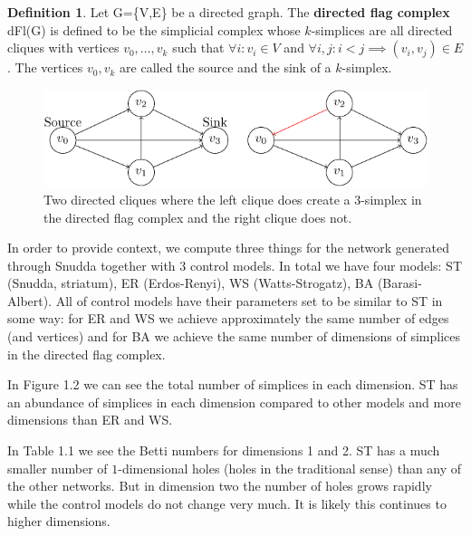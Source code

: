 \documentclass[oneside,a4paper,12pt, DIV=calc]{scrbook}
\theoremstyle{definition}
\newtheorem{definition}{Definition}
\begin{document}
\begin{definition}
  Let G=\{V,E\} be a directed graph. The \textbf{directed flag complex} dFl(G) is defined to be the simplicial complex whose $k$-simplices are all directed cliques with vertices $v_{0},\dots,v_{k}$ such that $\forall i: v_{i} \in V$
  and $\forall i,j: i < j \implies (v_{i}, v_{j}) \in E$. The vertices $v_{0}, v_{k}$ are called the source and the sink of a $k$-simplex.
\end{definition}

\begin{figure}[ht]
  \centering
  \includegraphics[]{./3simplex.pdf}
  \caption{\label{disimplex} Two directed cliques where the left clique does create a 3-simplex in the directed flag complex and the right clique does not.}
\end{figure}

In order to provide context, we compute three things for the network generated through Snudda together with 3 control models. In total we have four models: ST (Snudda, striatum), ER (Erdos-Renyi), WS (Watts-Strogatz), BA (Barasi-Albert). All of control models have their parameters set to be similar to ST in some way: for ER and WS we achieve approximately the same number of edges (and vertices) and for BA we achieve the same number of dimensions of simplices in the directed flag complex.

In Figure 1.2 we can see the total number of simplices in each dimension. ST has an abundance of simplices in each dimension compared to other models and more dimensions than ER and WS.

In Table 1.1 we see the Betti numbers for dimensions 1 and 2. ST has a much smaller number of $1$-dimensional holes (holes in the traditional sense) than any of the other networks. But in dimension two the number of holes grows rapidly while the control models do not change very much. It is likely this continues to higher dimensions.
\end{document}
